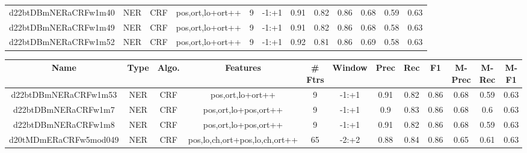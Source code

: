 \documentclass[a4paper]{article}
\begin{document}
\begin{landscape}
\begin{center}
\begin{tabular}{ |c|c|c|c|c|c|c|c|c|c|c|c|}
 
 	
 	\small{ d22btDBmNERaCRFw1m40 } & \small{ NER} & \small{  CRF }  & pos,ort,lo+ort++  &  9 &  \small{  -1:+1 }  &  0.91 & 0.82 & 0.86  &  0.68 & 0.59 & 0.63 \\
 	

 
 	
 	\small{ d22btDBmNERaCRFw1m49 } & \small{ NER} & \small{  CRF }  & pos,ort,lo+ort++  &  9 &  \small{  -1:+1 }  &  0.91 & 0.82 & 0.86  &  0.68 & 0.58 & 0.63 \\
 	

 
 	
 	\small{ d22btDBmNERaCRFw1m52 } & \small{ NER} & \small{  CRF }  & pos,ort,lo+ort++  &  9 &  \small{  -1:+1 }  &  0.92 & 0.81 & 0.86  &  0.69 & 0.58 & 0.63 \\
 	
 \hline
\end{tabular}
\end{center}




\begin{center}
\begin{tabular}{ |c|c|c|c|c|c|c|c|c|c|c|c|} 
 \hline
 	Name & Type & Algo. & Features & \# Ftrs & Window & Prec & Rec & F1 & M-Prec & M-Rec & M-F1\\
 \hline

 	

 
 	
 	\small{ d22btDBmNERaCRFw1m53 } & \small{ NER} & \small{  CRF }  & pos,ort,lo+ort++  &  9 &  \small{  -1:+1 }  &  0.91 & 0.82 & 0.86  &  0.68 & 0.59 & 0.63 \\
 	

 
 	
 	\small{ d22btDBmNERaCRFw1m7 } & \small{ NER} & \small{  CRF }  & pos,ort,lo+pos,ort++  &  9 &  \small{  -1:+1 }  &  0.9 & 0.83 & 0.86  &  0.68 & 0.6 & 0.63 \\
 	

 
 	
 	\small{ d22btDBmNERaCRFw1m8 } & \small{ NER} & \small{  CRF }  & pos,ort,lo+pos,ort++  &  9 &  \small{  -1:+1 }  &  0.91 & 0.82 & 0.86  &  0.68 & 0.59 & 0.63 \\
 	

 
 	
 	\small{ d20tMDmERaCRFw5mod049 } & \small{ NER} & \small{  CRF }  & pos,lo,ch,ort+pos,lo,ch,ort++  &  65 &  \small{  -2:+2 }  &  0.88 & 0.84 & 0.86  &  0.65 & 0.61 & 0.63 \\
 	


\end{tabular}
\end{center}
\end{landscape}
\end{document}
